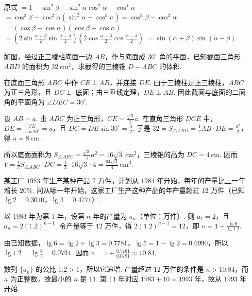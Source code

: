 \documentclass[UTF8,a4paper,oneside,11pt]{ctexbook}
\begin{document}
\begin{solution}
原式 \(=1-\sin^{2}\beta-\sin^{2}\alpha\cos^{2}\alpha-\cos^{4}\alpha\)
\(=\cos^{2}\beta-\cos^{2}\alpha(\sin^{2}\alpha+\cos^{2}\alpha)=\cos^{2}\beta-\cos^{2}\alpha\)
\(=(\cos\beta-\cos\alpha)(\cos\beta+\cos\alpha)\)
\(=\left(2\sin\frac{\alpha+\beta}{2}\sin\frac{\alpha-\beta}{2}\right)\left(2\cos\frac{\alpha+\beta}{2}\cos\frac{\alpha-\beta}{2}\right)\)
\(=\sin(\alpha+\beta)\sin(\alpha-\beta)\).
\end{solution}

\begin{problem}

如图，经过正三棱柱底面一边 \(AB\)，作与底面成 \(30^{\circ}\) 角的平面，已知截面三角形 \(ABD\) 的面积为 \(32\mathrm{~cm}^{2}\)，求截得的三棱锥 \(D - ABC\) 的体积.

\end{problem}

\begin{solution}
在底面三角形 \(ABC\) 中作 \(CE\perp AB\)，并连接 \(DE\). 由于三棱柱是正三棱柱，\(ABC\) 为正三角形，且 \(DC\perp\) 底面；由三垂线定理，\(DE\perp AB\). 因此截面与底面的二面角的平面角为 \(\angle DEC=30^{\circ}\).

设 \(AB=a\). 由 \(ABC\) 为正三角形，\(CE=\frac{\sqrt{3}}{2}a\). 在直角三角形 \(DCE\) 中，\(\displaystyle DE=\frac{CE}{\cos30^{\circ}}=a\)，且 \(DC=DE\sin30^{\circ}=\frac{a}{2}\). 于是 \(\displaystyle32=S_{\triangle ABD}=\frac{1}{2}AB\cdot DE=\frac{a^{2}}{2}\)，得 \(a=8\mathrm{~cm}\).

所以底面面积为 \(S_{\triangle ABC}=\frac{\sqrt{3}}{4}a^{2}=16\sqrt{3}\mathrm{~cm}^{2}\)，三棱锥的高为 \(DC=4\mathrm{~cm}\). 因而 \(\displaystyle V=\frac{1}{3}S_{\triangle ABC}\cdot DC=\frac{1}{3}\cdot16\sqrt{3}\cdot4=\frac{64\sqrt{3}}{3}\mathrm{~cm}^{3}\).
\end{solution}

\begin{problem}

某工厂 \(1983\) 年生产某种产品 \(2\text{ 万件}\)，计划从 \(1984\) 年开始，每年的产量比上一年增长 \(20\%\). 问从哪一年开始，这家工厂生产这种产品的年产量超过 \(12\text{ 万件}\)（已知 \(\lg 2 = 0.3010\)，\(\lg 3 = 0.4771\)）.
\end{problem}

\begin{solution}
以 \(1983\) 年为第 \(1\) 年，设第 \(n\) 年的产量为 \(a_n\)（单位：万件）. 则 \(a_1=2\)，且 \(a_n=2(1.2)^{n-1}\). 令产量等于 \(12\) 万件，得 \(\displaystyle2(1.2)^{n-1}=12\)，即 \(n=1+\frac{\lg6}{\lg1.2}\).

由已知数据，\(\lg6=\lg2+\lg3=0.7781\)，\(\lg5=1-\lg2=0.6990\)，所以 \(\lg1.2=\lg\frac{6}{5}=0.0791\). 因而 \(\displaystyle n=1+\frac{0.7781}{0.0791}\approx10.84\).

数列 \(\{a_n\}\) 的公比 \(1.2>1\)，所以它递增. 产量超过 \(12\) 万件的条件是 \(n>10.84\)，而 \(n\) 为正整数，故最小的 \(n\) 是 \(11\). 第 \(11\) 年对应 \(1983+10=1993\) 年，故从 \(1993\) 年开始.
\end{solution}
\end{document}
